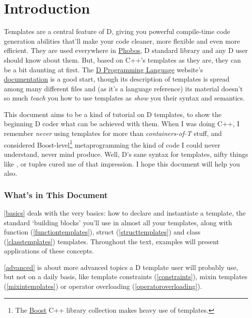 \newpage
{}
\part*{Introduction}\label{intro} %

Templates are a central feature of D, giving you powerful compile-time code generation abilities that'll make your code cleaner, more flexible and even more efficient. They are used everywhere in \href{http://www.dlang.org/phobos/}{Phobos}, D standard library and any D user should know about them. But, based on C++'s templates as they are, they can be a bit daunting at first. The \href{http://www.dlang.org}{D Programming Language} website's \href{http://www.dlang.org/template.html}{documentation} is a good start, though its description of templates is spread among many different files and (as it's a language reference) its material doesn't so much \emph{teach} you how to use templates as \emph{show} you their syntax and semantics.

This document aims to be a kind of tutorial on D templates, to show the beginning D coder what can be achieved with them. When I was doing C++, I remember \emph{never} using templates for more than \emph{containers-of-T} stuff, and considered Boost-level\footnote{ The \href{http://www.boost.org}{Boost} C++ library collection makes heavy use of templates.} metaprogramming the kind of code I could never understand, never mind produce. Well, D's sane syntax for templates, nifty things like ,  or tuples cured me of that impression. I hope this document will help you also.

\section*{What's in This Document}

\autoref{basics} deals with the very basics: how to declare and instantiate a template, the standard `building blocks' you'll use in almost all your templates, along with function (\ref{functiontemplates}), struct (\ref{structtemplates}) and class (\ref{classtemplates}) templates. Throughout the text, examples will present applications of these concepts. 

\autoref{advanced} is about more advanced topics a D template user will probably use, but not on a daily basis, like template constraints (\ref{constraints}), mixin templates (\ref{mixintemplates}) or operator overloading (\ref{operatoroverloading}). 

